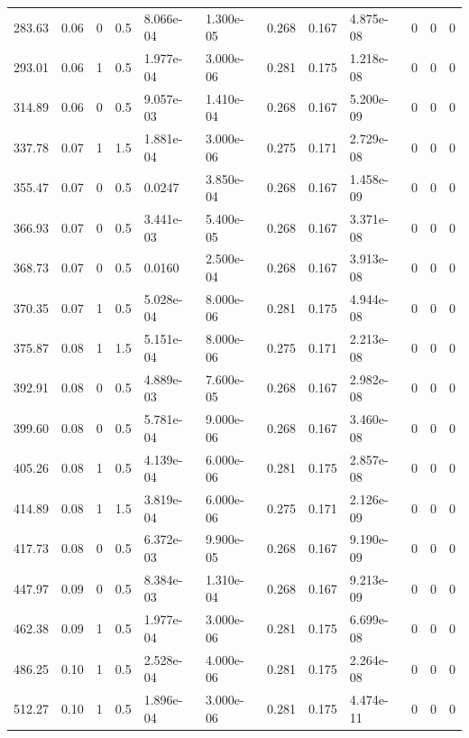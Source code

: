 \documentclass[preview]{standalone}
\begin{document}
{{\begin{tabular}{L{1.2cm}C{1.2cm} C{0.3cm}C{0.5cm} C{1.4cm}C{1.4cm} C{1.4cm}C{1.4cm} C{1.6cm}C{1.6cm} C{1.6cm}C{1.6cm}}
  283.63  &  0.06  & 0     & 0.5 &  8.066e-04  & 1.300e-05  &  0.268&   0.167& 4.875e-08 & 0   &  0 & 0  \\ 
  293.01  &  0.06  & 1     & 0.5 &  1.977e-04  & 3.000e-06  &  0.281&   0.175& 1.218e-08 & 0   &  0 & 0  \\ 
  314.89  &  0.06  & 0     & 0.5 &  9.057e-03  & 1.410e-04  &  0.268&   0.167& 5.200e-09 & 0   &  0 & 0  \\ 
  337.78  &  0.07  & 1     & 1.5 &  1.881e-04  & 3.000e-06  &  0.275&   0.171& 2.729e-08 & 0   &  0 & 0  \\ 
  355.47  &  0.07  & 0     & 0.5 &  0.0247  & 3.850e-04  &  0.268&   0.167& 1.458e-09 & 0   &  0 & 0  \\ 
  366.93  &  0.07  & 0     & 0.5 &  3.441e-03  & 5.400e-05  &  0.268&   0.167& 3.371e-08 & 0   &  0 & 0  \\ 
  368.73  &  0.07  & 0     & 0.5 &  0.0160  & 2.500e-04  &  0.268&   0.167& 3.913e-08 & 0   &  0 & 0  \\ 
  370.35  &  0.07  & 1     & 0.5 &  5.028e-04  & 8.000e-06  &  0.281&   0.175& 4.944e-08 & 0   &  0 & 0  \\ 
  375.87  &  0.08  & 1     & 1.5 &  5.151e-04  & 8.000e-06  &  0.275&   0.171& 2.213e-08 & 0   &  0 & 0  \\ 
  392.91  &  0.08  & 0     & 0.5 &  4.889e-03  & 7.600e-05  &  0.268&   0.167& 2.982e-08 & 0   &  0 & 0  \\ 
  399.60  &  0.08  & 0     & 0.5 &  5.781e-04  & 9.000e-06  &  0.268&   0.167& 3.460e-08 & 0   &  0 & 0  \\ 
  405.26  &  0.08  & 1     & 0.5 &  4.139e-04  & 6.000e-06  &  0.281&   0.175& 2.857e-08 & 0   &  0 & 0  \\ 
  414.89  &  0.08  & 1     & 1.5 &  3.819e-04  & 6.000e-06  &  0.275&   0.171& 2.126e-09 & 0   &  0 & 0  \\ 
  417.73  &  0.08  & 0     & 0.5 &  6.372e-03  & 9.900e-05  &  0.268&   0.167& 9.190e-09 & 0   &  0 & 0  \\ 
  447.97  &  0.09  & 0     & 0.5 &  8.384e-03  & 1.310e-04  &  0.268&   0.167& 9.213e-09 & 0   &  0 & 0  \\ 
  462.38  &  0.09  & 1     & 0.5 &  1.977e-04  & 3.000e-06  &  0.281&   0.175& 6.699e-08 & 0   &  0 & 0  \\ 
  486.25  &  0.10  & 1     & 0.5 &  2.528e-04  & 4.000e-06  &  0.281&   0.175& 2.264e-08 & 0   &  0 & 0  \\ 
  512.27  &  0.10  & 1     & 0.5 &  1.896e-04  & 3.000e-06  &  0.281&   0.175& 4.474e-11 & 0   &  0 & 0  \\ 

\end{tabular}}}
\end{document}
